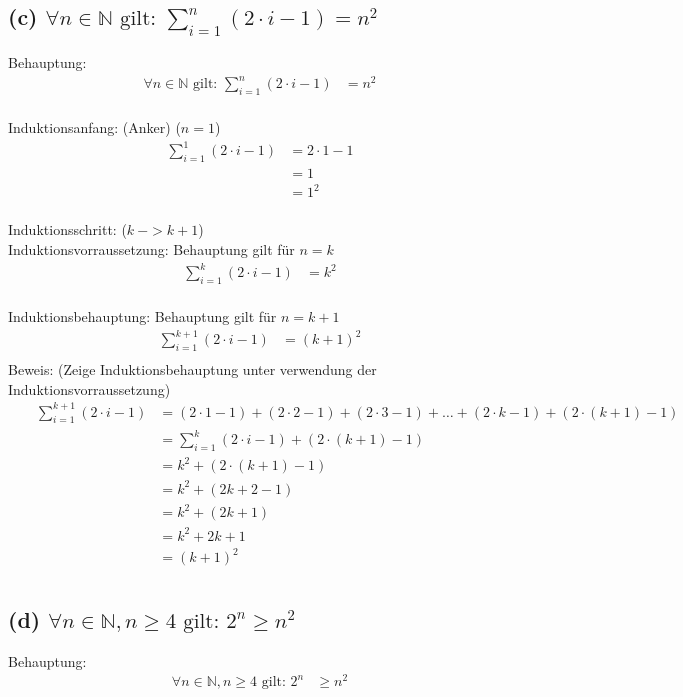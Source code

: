 \documentclass[]{article}
\begin{document}
\newpage
\subsection*{(c) $\forall n \in \mathbb{N} \text{ gilt: } \sum_{i=1}^{n}(2\cdot i-1) = n^2 $}
Behauptung:
\begin{align*}
	 && \forall n \in \mathbb{N} \text{ gilt: } \sum_{i=1}^{n}(2\cdot i-1) &= n^2 &&\\
\end{align*}

Induktionsanfang: (Anker) ($n = 1$)
\begin{align*}
	 && \sum_{i=1}^{1}(2\cdot i-1) &= 2 \cdot 1 - 1 &&\\
	 && &= 1 &&\\
	 && &= 1^2 &&\\
\end{align*}

Induktionsschritt: ($k~ -> k+1$)\\
Induktionsvorraussetzung: Behauptung gilt für $n = k$\\
\begin{align*}
	 && \sum_{i=1}^{k}(2\cdot i-1) &= k^2 &&\\
\end{align*}


Induktionsbehauptung: Behauptung gilt für $n = k+1$\\
\begin{align*}
	 && \sum_{i=1}^{k+1}(2\cdot i-1) &= (k+1)^2 &&\\
\end{align*}
Beweis: (Zeige Induktionsbehauptung unter verwendung der Induktionsvorraussetzung)\\
\begin{align*}
	 && \sum_{i=1}^{k+1}(2\cdot i-1) &= (2\cdot 1 -1) + (2\cdot 2 -1)+ (2\cdot 3 -1) + \dots +(2\cdot k -1) +(2\cdot (k+1) -1)&&\\
	 && &= \sum_{i=1}^{k}(2\cdot i-1) +(2\cdot (k+1) -1)&&\\
	 && &= k^2 +(2\cdot (k+1) -1)&&\\
	 && &= k^2 +(2k+2 -1)&&\\
	 && &= k^2 +(2k+1)&&\\
	 && &= k^2 +2k+1&&\\
	 && &= (k+1)^2&&\\
\end{align*}

\newpage
\subsection*{(d) $\forall n \in \mathbb{N}, n \geq 4 \text{ gilt: } 2^n \geq n^2$}
Behauptung:
\begin{align*}
	 && \forall n \in \mathbb{N}, n \geq 4 \text{ gilt: } 2^n &\geq n^2 &&\\
\end{align*}
\end{document}
